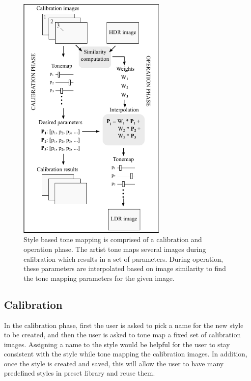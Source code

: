 \begin{figure}
\begin{center}
\includegraphics[width=0.65\textwidth]{figures/chapter5/algorithm.pdf}
\caption{Style based tone mapping is comprised of a calibration and operation phase. The artist tone maps several images during calibration which results in a set of parameters. During operation, these parameters are interpolated based on image similarity to find the tone mapping parameters for the given image.}
\label{fig:calibration_operation}
\end{center}
\end{figure}

\subsection{Calibration}
\label{sec:calibration}
In the calibration phase, first the user is asked to pick a name for the new style to be created, and then the user is asked to tone map a fixed set of calibration images. Assigning a name to the style would be helpful for the user to stay consistent with the style while tone mapping the calibration images. In addition, once the style is created and saved, this will allow the user to have many predefined styles in preset library and reuse them. 


